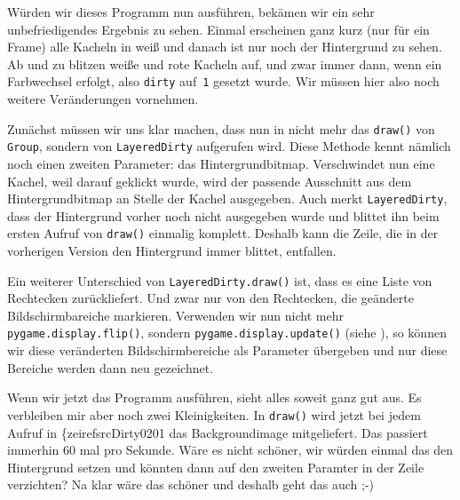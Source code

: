 
Würden wir dieses Programm nun ausführen, bekämen wir ein sehr unbefriedigendes Ergebnis zu sehen. Einmal erscheinen ganz kurz (nur für ein Frame) alle Kacheln in weiß und danach ist nur noch der Hintergrund zu sehen. Ab und zu blitzen weiße und rote Kacheln auf, und zwar immer dann, wenn ein Farbwechsel erfolgt, also \texttt{dirty} auf~\texttt{1} gesetzt wurde. Wir müssen hier also noch weitere Veränderungen vornehmen. 

Zunächst müssen wir uns klar machen, dass nun in  nicht mehr das \texttt{draw()} von \texttt{Group}, sondern von \texttt{LayeredDirty} aufgerufen wird. Diese Methode kennt nämlich noch einen zweiten Parameter: das Hintergrundbitmap. Verschwindet nun eine Kachel, weil darauf geklickt wurde, wird der passende Ausschnitt aus dem Hintergrundbitmap an Stelle der Kachel ausgegeben. Auch merkt \texttt{LayeredDirty}, dass der Hintergrund vorher noch nicht ausgegeben wurde und blittet ihn beim ersten Aufruf von \texttt{draw()} einmalig komplett. Deshalb kann die Zeile, die in der vorherigen Version den Hintergrund immer blittet, entfallen.

Ein weiterer Unterschied von \texttt{LayeredDirty.draw()} ist, dass es eine Liste von Rechtecken zurückliefert. Und zwar nur von den Rechtecken, die geänderte Bildschirmbareiche markieren. Verwenden wir nun nicht mehr \texttt{pygame.display.flip()}, sondern \texttt{pygame.display.update()} (siehe ), so können wir diese veränderten Bildschirmbereiche als Parameter übergeben und nur diese Bereiche werden dann neu gezeichnet.



Wenn wir jetzt das Programm ausführen, sieht alles soweit ganz gut aus. Es verbleiben mir aber noch zwei Kleinigkeiten. In \texttt{draw()} wird jetzt bei jedem Aufruf in \{zeiref{srcDirty0201} das Backgroundimage mitgeliefert. Das passiert immerhin 60 mal pro Sekunde. Wäre es nicht schöner, wir würden einmal das den Hintergrund setzen und könnten dann auf den zweiten Paramter in der Zeile verzichten? Na klar wäre das schöner und deshalb geht das auch ;-)

